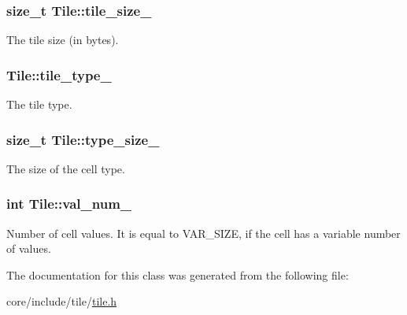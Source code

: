 \subsubsection[{tile\+\_\+size\+\_\+}]{\setlength{\rightskip}{0pt plus 5cm}size\+\_\+t Tile\+::tile\+\_\+size\+\_\+\hspace{0.3cm}{\ttfamily [private]}}\label{classTile_a7a57b326881fca47f8e60434929762fb}
The tile size (in bytes). \hypertarget{classTile_aca1d244ab42a15bf20027943bafee10d}{}
\subsubsection[{tile\+\_\+type\+\_\+}]{ Tile\+::tile\+\_\+type\+\_\+\hspace{0.3cm}{\ttfamily [private]}}\label{classTile_aca1d244ab42a15bf20027943bafee10d}
The tile type. \hypertarget{classTile_a7bd705d7ae14035443f4e111d6d43f09}{}
\subsubsection[{type\+\_\+size\+\_\+}]{\setlength{\rightskip}{0pt plus 5cm}size\+\_\+t Tile\+::type\+\_\+size\+\_\+\hspace{0.3cm}{\ttfamily [private]}}\label{classTile_a7bd705d7ae14035443f4e111d6d43f09}
The size of the cell type. \hypertarget{classTile_ab5f3455de50e1e92d43730c120dbb9f1}{}
\subsubsection[{val\+\_\+num\+\_\+}]{\setlength{\rightskip}{0pt plus 5cm}int Tile\+::val\+\_\+num\+\_\+\hspace{0.3cm}{\ttfamily [private]}}\label{classTile_ab5f3455de50e1e92d43730c120dbb9f1}
Number of cell values. It is equal to V\+A\+R\+\_\+\+S\+I\+Z\+E, if the cell has a variable number of values. 

The documentation for this class was generated from the following file\+:\begin{DoxyCompactItemize}
\item 
core/include/tile/\hyperlink{tile_8h}{tile.\+h}\end{DoxyCompactItemize}
